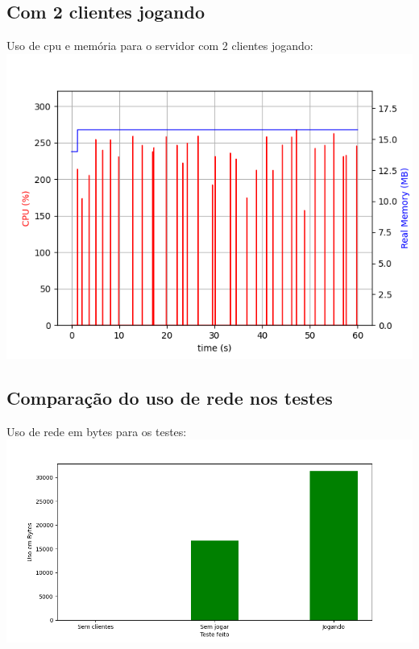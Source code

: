 \documentclass[12pt]{beamer}
\begin{document}
\subsection{Com 2 clientes jogando}
\begin{frame}
  Uso de cpu e memória para o servidor com 2 clientes jogando:
  \includegraphics[scale=0.6]{./servidorjogando.png}
\end{frame}
\subsection{Comparação do uso de rede nos testes}
\begin{frame}
  Uso de rede em bytes para os testes:
  \includegraphics[scale=0.427]{./grafico.png}
\end{frame}
\end{document}
